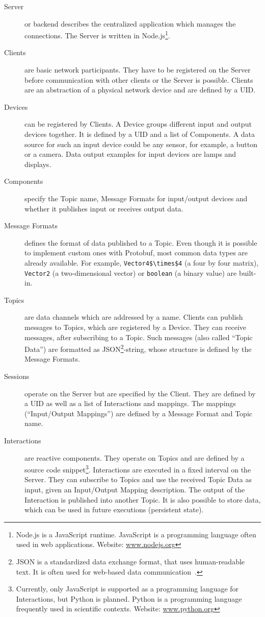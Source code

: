 \begin{description}
	\item[Server] or backend describes the centralized application which manages the connections. The Server is written in Node.js\footnote{Node.js is a JavaScript runtime. JavaScript is a programming language often used in web applications. Website: \href{https://nodejs.org/}{www.nodejs.org}}.
	\item[Clients] are basic network participants. They have to be registered on the Server before communication with other clients or the Server is possible. Clients are an abstraction of a physical network device and are defined by a \gls{UID}.
	\item[Devices] can be registered by Clients. A Device groups different input and output devices together. It is defined by a \gls{UID} and a list of Components. A data source for such an input device could be any sensor, for example, a button or a camera. Data output examples for input devices are lamps and displays.
	\item[Components] specify the Topic name, Message Formats for input/output devices and whether it publishes input or receives output data. 
	\item[Message Formats] defines the format of data published to a Topic. Even though it is possible to implement custom ones with \gls{Protobuf}, most common data types are already available. For example, \lstinline[mathescape=true]{Vector4$\times$4} (a four by four matrix), \lstinline{Vector2} (a two-dimensional vector) or \lstinline{boolean} (a binary value) are built-in. %
	\item[Topics] are data channels which are addressed by a name. Clients can publish messages to Topics, which are registered by a Device. They can receive messages, after subscribing to a Topic. Such messages (also called \enquote{Topic Data}) are formatted as JSON\footnote{JSON is a standardized data exchange format, that uses human-readable text. It is often used for web-based data communication~\cite[iii]{ECMAInternational.2017}.}-string, whose structure is defined by the Message Formats.
	\item[Sessions] operate on the Server but are specified by the Client. They are defined by a \gls{UID} as well as a list of Interactions and mappings. The mappings (\enquote{Input/Output Mappings}) are defined by a Message Format and Topic name.
	\item[Interactions] are reactive components. They operate on Topics and are defined by a source code snippet\footnote{Currently, only JavaScript is supported as a programming language for Interactions, but Python is planned. Python is a programming language frequently used in scientific contexts. Website: \href{https://www.python.org/}{www.python.org}}. Interactions are executed in a fixed interval on the Server. They can subscribe to Topics and use the received Topic Data as input, given an Input/Output Mapping description. The output of the Interaction is published into another Topic. It is also possible to store data, which can be used in future executions (persistent state).

\end{description}
